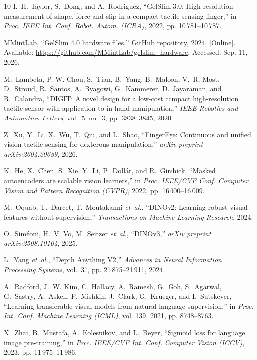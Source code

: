 \documentclass[letterpaper,10pt,conference]{ieeeconf}
\begin{document}
\begin{thebibliography}{10}
I.~H. Taylor, S.~Dong, and A.~Rodriguez, ``{GelSlim 3.0}: High-resolution
  measurement of shape, force and slip in a compact tactile-sensing finger,''
  in \emph{Proc. IEEE Int. Conf. Robot. Autom. (ICRA)}, 2022, pp.
  10\,781--10\,787.

{MMintLab}, ``{GelSlim} 4.0 hardware files,'' GitHub repository, 2024.
  [Online]. Available: \url{https://github.com/MMintLab/gelslim_hardware}.
  Accessed: Sep. 11, 2026.

M.~Lambeta, P.-W. Chou, S.~Tian, B.~Yang, B.~Maloon, V.~R. Most, D.~Stroud,
  R.~Santos, A.~Byagowi, G.~Kammerer, D.~Jayaraman, and R.~Calandra, ``{DIGIT}:
  A novel design for a low-cost compact high-resolution tactile sensor with
  application to in-hand manipulation,'' \emph{IEEE Robotics and Automation} \emph{Letters}, vol.~5, no.~3, pp. 3838--3845, 2020.

Z.~Xu, Y.~Li, X.~Wu, T.~Qiu, and L.~Shao, ``{FingerEye}: Continuous and
  unified vision-tactile sensing for dexterous manipulation,''
  \emph{arXiv preprint arXiv:2604.20689}, 2026.

K.~He, X.~Chen, S.~Xie, Y.~Li, P.~Doll{\'a}r, and R.~Girshick, ``Masked
  autoencoders are scalable vision learners,'' in \emph{Proc. IEEE/CVF Conf.
  Computer Vision and Pattern} \emph{Recognition (CVPR)}, 2022, pp. 16\,000--16\,009.

M.~Oquab, T.~Darcet, T.~Moutakanni \emph{et~al.}, ``{DINOv2}: Learning robust
  visual features without supervision,'' \emph{Transactions} \emph{on Machine Learning
  Research}, 2024.

O.~Sim{\'e}oni, H.~V. Vo, M.~Seitzer \emph{et~al.}, ``{DINOv3},'' \emph{arXiv
  preprint arXiv:2508.10104}, 2025.

L.~Yang \emph{et~al.}, ``{Depth Anything V2},'' \emph{Advances in Neural
Information Processing Systems}, vol.~37, pp. 21\,875--21\,911, 2024.

A.~Radford, J.~W. Kim, C.~Hallacy, A.~Ramesh, G.~Goh, S.~Agarwal, G.~Sastry,
  A.~Askell, P.~Mishkin, J.~Clark, G.~Krueger, and I.~Sutskever, ``Learning
  transferable visual models from natural language supervision,'' in
  \emph{Proc. Int. Conf. Machine Learning (ICML)}, vol. 139, 2021, pp. 8748--8763.

X.~Zhai, B.~Mustafa, A.~Kolesnikov, and L.~Beyer, ``Sigmoid loss for language
  image pre-training,'' in \emph{Proc. IEEE/CVF Int. Conf. Computer} \emph{Vision
  (ICCV)}, 2023, pp. 11\,975--11\,986.


\end{thebibliography}
\end{document}
